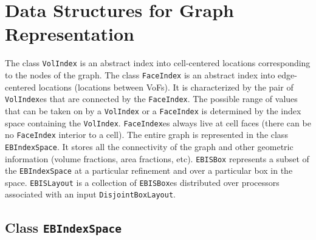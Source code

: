 \section{Data Structures for Graph Representation}
\label{sec::graph}
The class {\tt VolIndex} is an abstract index into cell-centered locations
corresponding to the nodes of the graph.  
The class {\tt FaceIndex} is an abstract index into edge-centered locations
(locations between VoFs).
It is characterized by the pair of {\tt VolIndex}es that are connected by the
{\tt FaceIndex}. The possible range of values that can be taken on
by a {\tt VolIndex} or a {\tt FaceIndex} is determined by the index space 
containing the {\tt VolIndex}. {\tt FaceIndex}es always live at cell faces 
(there can be no {\tt FaceIndex} interior to a cell).
The entire graph is represented in the class {\tt EBIndexSpace}.
It stores all the connectivity of the graph and other
geometric information (volume fractions, area fractions, etc).
{\tt EBISBox} represents a subset of the {\tt EBIndexSpace} at a
particular refinement and over a particular box in the space.
{\tt EBISLayout} is a collection of {\tt EBISBox}es distributed
over processors associated with an input {\tt DisjointBoxLayout}.

\subsection{Class {\tt EBIndexSpace}}
\label{sec::EBIndexSpace}

